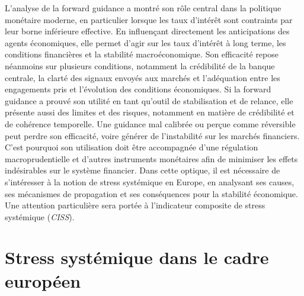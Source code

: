 L'analyse de la forward guidance a montré son rôle central dans la politique monétaire moderne, en particulier lorsque les taux d'intérêt sont contraints par leur borne inférieure effective. En influençant directement les anticipations des agents économiques, elle permet d’agir sur les taux d'intérêt à long terme, les conditions financières et la stabilité macroéconomique. Son efficacité repose néanmoins sur plusieurs conditions, notamment la crédibilité de la banque centrale, la clarté des signaux envoyés aux marchés et l'adéquation entre les engagements pris et l'évolution des conditions économiques. Si la forward guidance a prouvé son utilité en tant qu’outil de stabilisation et de relance, elle présente aussi des limites et des risques, notamment en matière de crédibilité et de cohérence temporelle. Une guidance mal calibrée ou perçue comme réversible peut perdre son efficacité, voire générer de l’instabilité sur les marchés financiers. C’est pourquoi son utilisation doit être accompagnée d’une régulation macroprudentielle et d’autres instruments monétaires afin de minimiser les effets indésirables sur le système financier. Dans cette optique, il est nécessaire de s’intéresser à la notion de stress systémique en Europe, en analysant ses causes, ses mécanismes de propagation et ses conséquences pour la stabilité économique. Une attention particulière sera portée à l’indicateur composite de stress systémique (\textit{CISS}).

\section{Stress systémique dans le cadre européen}

